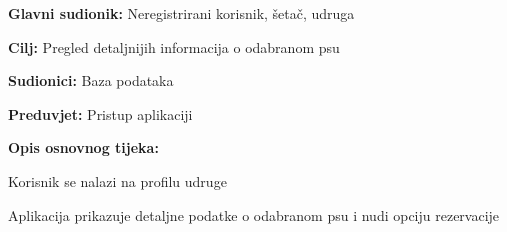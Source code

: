 					
					
					
					
					\noindent {}
					\begin{packed_item}
	
						\item \textbf{Glavni sudionik:} Neregistrirani korisnik, šetač, udruga
						\item  \textbf{Cilj:} Pregled detaljnijih informacija o odabranom psu
						\item  \textbf{Sudionici:} Baza podataka
						\item  \textbf{Preduvjet:} Pristup aplikaciji
						\item  \textbf{Opis osnovnog tijeka:}
						
						\item[] \begin{packed_enum}
							\item Korisnik se nalazi na profilu udruge
							\item Aplikacija prikazuje detaljne podatke o odabranom psu i nudi opciju rezervacije
						\end{packed_enum}
						
					\end{packed_item}
					
